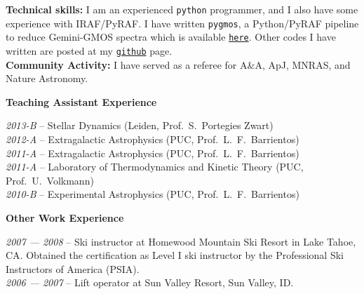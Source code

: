 \documentclass[11pt]{article}
\newcommand\technical[2]{
  \noindent
    {\large\bf #1:} #2\\
  }
\newcommand\sectitle[1]{
  \vspace{0.5cm}
  \noindent
  \textbf{\large #1}\\
  \vspace{-0.2cm}
}
\begin{document}
\vspace{-0.5cm}
\technical{Technical skills}
{I am an experienced \texttt{python} programmer, and I also have some experience 
with IRAF/PyRAF. I have written {\tt pygmos}, a Python/PyRAF pipeline to reduce 
Gemini-GMOS spectra which is available 
\href{https://github.com/cristobal-sifon/pygmos/}{\texttt{here}}. Other codes I 
have written are posted at my 
\href{https://github.com/cristobal-sifon}{\texttt{github}} page.}


%

\technical{Community Activity}
{I have served as a referee for A\&A, ApJ, MNRAS, and Nature Astronomy.}


\pagebreak
\sectitle{Teaching Assistant Experience}

\noindent
\emph{2013-B} -- Stellar Dynamics (Leiden, Prof.~S.~Portegies Zwart)\\
\emph{2012-A} -- Extragalactic Astrophysics (PUC, Prof.~L.~F.~Barrientos)\\
\emph{2011-A} -- Extragalactic Astrophysics (PUC, Prof.~L.~F.~Barrientos)\\
\emph{2011-A} -- Laboratory of Thermodynamics and Kinetic Theory (PUC, Prof.~U.~Volkmann)\\
\emph{2010-B} -- Experimental Astrophysics (PUC, Prof.~L.~F.~Barrientos)


\sectitle{Other Work Experience}

\noindent
\emph{2007 --- 2008} -- Ski instructor at Homewood Mountain Ski Resort in Lake Tahoe, CA. Obtained the certification as Level I ski instructor  by the Professional Ski Instructors of America (PSIA).\\
\emph{2006 --- 2007} -- Lift operator at Sun Valley Resort, Sun Valley, ID.

\vspace{1cm}
\hline
\vspace{1cm}
\end{document}
